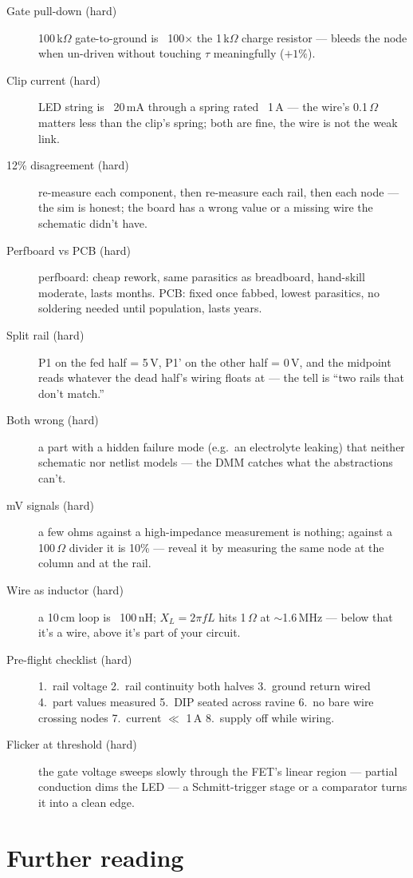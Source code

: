 \begin{description}
\item[Gate pull-down (hard)] 100\,k$\Omega$ gate-to-ground is ~100$\times$
the 1\,k$\Omega$ charge resistor --- bleeds the node when un-driven
without touching $\tau$ meaningfully ($+1\%$).
\item[Clip current (hard)] LED string is ~20\,mA through a spring
rated ~1\,A --- the wire's 0.1\,$\Omega$ matters less than the
clip's spring; both are fine, the wire is not the weak link.
\item[12\% disagreement (hard)] re-measure each component, then
re-measure each rail, then each node --- the sim is honest; the
board has a wrong value or a missing wire the schematic didn't
have.
\item[Perfboard vs PCB (hard)] perfboard: cheap rework, same
parasitics as breadboard, hand-skill moderate, lasts months. PCB:
fixed once fabbed, lowest parasitics, no soldering needed until
population, lasts years.
\item[Split rail (hard)] P1 on the fed half = 5\,V, P1' on the other
half = 0\,V, and the midpoint reads whatever the dead half's wiring
floats at --- the tell is ``two rails that don't match.''
\item[Both wrong (hard)] a part with a hidden failure mode (e.g.\
an electrolyte leaking) that neither schematic nor netlist models
--- the DMM catches what the abstractions can't.
\item[mV signals (hard)] a few ohms against a high-impedance
measurement is nothing; against a 100\,$\Omega$ divider it is 10\%
--- reveal it by measuring the same node at the column and at the
rail.
\item[Wire as inductor (hard)] a 10\,cm loop is ~100\,nH;
$X_L = 2\pi fL$ hits 1\,$\Omega$ at $\sim$1.6\,MHz --- below that
it's a wire, above it's part of your circuit.
\item[Pre-flight checklist (hard)] 1.\ rail voltage 2.\ rail
continuity both halves 3.\ ground return wired 4.\ part values
measured 5.\ DIP seated across ravine 6.\ no bare wire crossing
nodes 7.\ current $\ll$ 1\,A 8.\ supply off while wiring.
\item[Flicker at threshold (hard)] the gate voltage sweeps slowly
through the FET's linear region --- partial conduction dims the LED
--- a Schmitt-trigger stage or a comparator turns it into a clean
edge.
\end{description}

\section*{Further reading}

